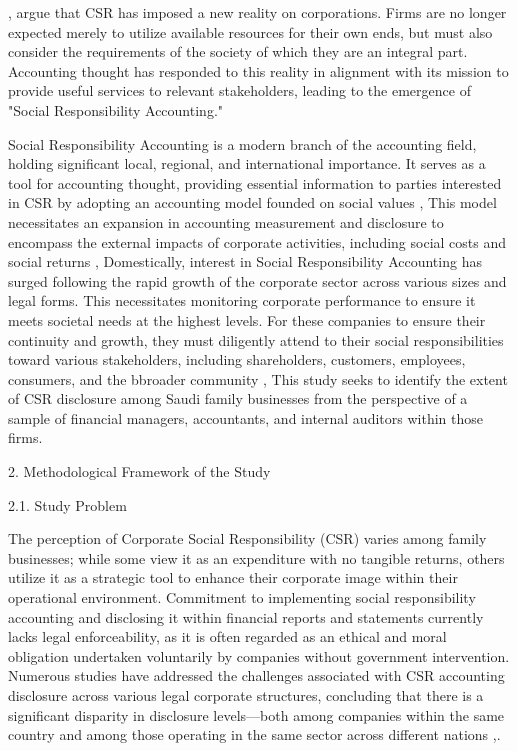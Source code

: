 \documentclass[10pt]{NSP1}
\begin{document}
\cite{ref2}, argue that CSR has imposed a new reality on corporations. Firms are no longer expected merely to utilize available resources for their own ends, but must also consider the requirements of the society of which they are an integral part. Accounting thought has responded to this reality in alignment with its mission to provide useful services to relevant stakeholders, leading to the emergence of "Social Responsibility Accounting."

Social Responsibility Accounting is a modern branch of the accounting field, holding significant local, regional, and international importance. It serves as a tool for accounting thought, providing essential information to parties interested in CSR by adopting an accounting model founded on social values \cite{ref3}, This model necessitates an expansion in accounting measurement and disclosure to encompass the external impacts of corporate activities, including social costs and social returns \cite{ref4}, Domestically, interest in Social Responsibility Accounting has surged following the rapid growth of the corporate sector across various sizes and legal forms. This necessitates monitoring corporate performance to ensure it meets societal needs at the highest levels. For these companies to ensure their continuity and growth, they must diligently attend to their social responsibilities toward various stakeholders, including shareholders, customers, employees, consumers, and the bbroader community \cite{ref5}, This study seeks to identify the extent of CSR disclosure among Saudi family businesses from the perspective of a sample of financial managers, accountants, and internal auditors within those firms.

2. Methodological Framework of the Study

2.1. Study Problem

The perception of Corporate Social Responsibility (CSR) varies among family businesses; while some view it as an expenditure with no tangible returns, others utilize it as a strategic tool to enhance their corporate image within their operational environment. Commitment to implementing social responsibility accounting and disclosing it within financial reports and statements currently lacks legal enforceability, as it is often regarded as an ethical and moral obligation undertaken voluntarily by companies without government intervention. Numerous studies have addressed the challenges associated with CSR accounting disclosure across various legal corporate structures, concluding that there is a significant disparity in disclosure levels—both among companies within the same country and among those operating in the same sector across different nations \cite{ref37},.
\end{document}
